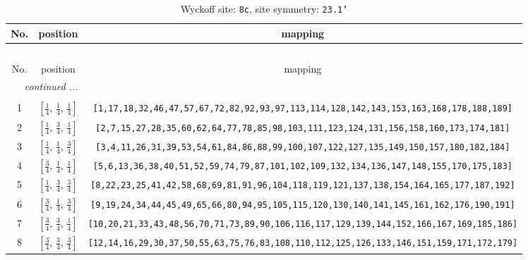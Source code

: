 \documentclass[fleqn,8pt]{jsarticle}
\begin{document}
\begin{longtable}{ccc}
\caption{Wyckoff site: {\tt 8c}, site symmetry: {\tt 23.1'}}
 \\
 \hline \hline
No. & position & mapping \\ \hline \endfirsthead

\multicolumn{2}{l}{\tablename\ \thetable{}} \\
 \hline \hline
No. & position & mapping \\ \hline \endhead

 \hline \hline
\multicolumn{2}{r}{\footnotesize\it continued ...} \\ \endfoot

 \hline \hline
\multicolumn{2}{r}{} \\ \endlastfoot

1 & $\left[ \frac{1}{4},\, \frac{1}{4},\, \frac{1}{4} \right]$ & {\tt [1,17,18,32,46,47,57,67,72,82,92,93,97,113,114,128,142,143,153,163,168,178,188,189]} \\ \hline
2 & $\left[ \frac{1}{4},\, \frac{3}{4},\, \frac{1}{4} \right]$ & {\tt [2,7,15,27,28,35,60,62,64,77,78,85,98,103,111,123,124,131,156,158,160,173,174,181]} \\ \hline
3 & $\left[ \frac{1}{4},\, \frac{1}{4},\, \frac{3}{4} \right]$ & {\tt [3,4,11,26,31,39,53,54,61,84,86,88,99,100,107,122,127,135,149,150,157,180,182,184]} \\ \hline
4 & $\left[ \frac{3}{4},\, \frac{1}{4},\, \frac{1}{4} \right]$ & {\tt [5,6,13,36,38,40,51,52,59,74,79,87,101,102,109,132,134,136,147,148,155,170,175,183]} \\ \hline
5 & $\left[ \frac{1}{4},\, \frac{3}{4},\, \frac{3}{4} \right]$ & {\tt [8,22,23,25,41,42,58,68,69,81,91,96,104,118,119,121,137,138,154,164,165,177,187,192]} \\ \hline
6 & $\left[ \frac{3}{4},\, \frac{1}{4},\, \frac{3}{4} \right]$ & {\tt [9,19,24,34,44,45,49,65,66,80,94,95,105,115,120,130,140,141,145,161,162,176,190,191]} \\ \hline
7 & $\left[ \frac{3}{4},\, \frac{3}{4},\, \frac{1}{4} \right]$ & {\tt [10,20,21,33,43,48,56,70,71,73,89,90,106,116,117,129,139,144,152,166,167,169,185,186]} \\ \hline
8 & $\left[ \frac{3}{4},\, \frac{3}{4},\, \frac{3}{4} \right]$ & {\tt [12,14,16,29,30,37,50,55,63,75,76,83,108,110,112,125,126,133,146,151,159,171,172,179]} \\
\end{longtable}
\renewcommand{\arraystretch}{1.2}
\end{document}
